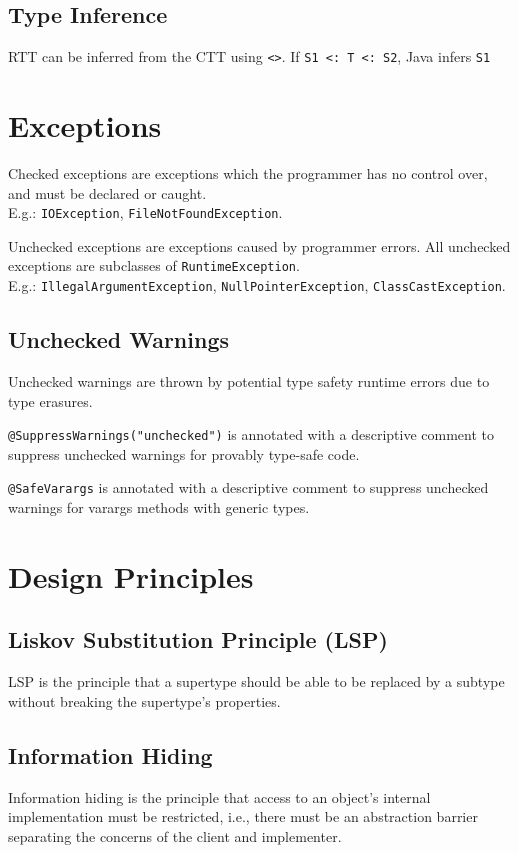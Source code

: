 \documentclass[12pt, a4paper]{article}
\begin{document}
\begin{multicols*}{3}
\subsection{Type Inference}
RTT can be inferred from the CTT using \lstinline|<>|.
If \lstinline|S1 <: T <: S2|, Java infers \lstinline|S1|
\section{Exceptions}
Checked exceptions are exceptions which the programmer has no control over, and must be declared or caught.\\E.g.: \lstinline|IOException|, \lstinline|FileNotFoundException|.

Unchecked exceptions are exceptions caused by programmer errors. All unchecked exceptions are subclasses of \lstinline|RuntimeException|.\\E.g.: \lstinline|IllegalArgumentException|, \lstinline|NullPointerException|, \lstinline|ClassCastException|.

\subsection{Unchecked Warnings}
Unchecked warnings are thrown by potential type safety runtime errors due to type erasures.

\lstinline|@SuppressWarnings("unchecked")| is annotated with a descriptive comment to suppress unchecked warnings for provably type-safe code.

\lstinline|@SafeVarargs| is annotated with a descriptive comment to suppress unchecked warnings for varargs methods with generic types.

\section{Design Principles}
\subsection{Liskov Substitution Principle (LSP)}
LSP is the principle that a supertype should be able to be replaced by a subtype without breaking the supertype's properties.
\subsection{Information Hiding}
Information hiding is the principle that access to an object's internal implementation must be restricted, i.e., there must be an abstraction barrier separating the concerns of the client and implementer.


\end{multicols*}
\end{document}
